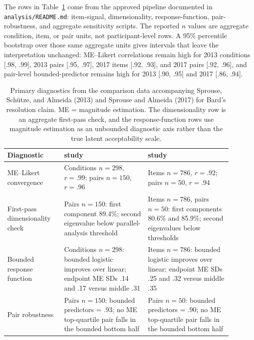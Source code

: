 The rows in Table~\ref{tab:sprouse-diagnostics} come from the approved pipeline
documented in \texttt{analysis/README.md}: item-signal, dimensionality,
response-function, pair-robustness, and aggregate sensitivity scripts. The
reported \(n\) values are aggregate condition, item, or pair units, not
participant-level rows. A 95\% percentile bootstrap over those same aggregate
units gives intervals that leave the interpretation unchanged: ME--Likert
correlations remain high for 2013 conditions [.98, .99], 2013 pairs [.95,
.97], 2017 items [.92, .93], and 2017 pairs [.92, .96], and pair-level
bounded-predictor \Rsq{} remains high for 2013 [.90, .95] and 2017
[.86, .94].

\begin{table}[H]
\centering
\small
\renewcommand{\arraystretch}{1.08}
\begin{tabular}{@{}>{\raggedright\arraybackslash}p{0.23\linewidth}>{\raggedright\arraybackslash}p{0.34\linewidth}>{\raggedright\arraybackslash}p{0.34\linewidth}@{}}
\toprule
Diagnostic & 2013 study & 2017 study \\
\midrule
ME--Likert convergence & Conditions \(n=298\), \(r=.99\); pairs \(n=150\), \(r=.96\) & Items \(n=786\), \(r=.92\); pairs \(n=50\), \(r=.94\) \\ \addlinespace[2pt]
First-pass dimensionality check & Pairs \(n=150\): first component 89.4\%; second eigenvalue below parallel-analysis threshold & Items \(n=786\), pairs \(n=50\): first components 80.6\% and 85.9\%; second eigenvalues below thresholds \\ \addlinespace[2pt]
Bounded response function & Conditions \(n=298\): bounded logistic improves over linear; endpoint ME SDs .14 and .17 versus middle .31 & Items \(n=786\): bounded logistic improves over linear; endpoint ME SDs .25 and .32 versus middle .35 \\ \addlinespace[2pt]
Pair robustness & Pairs \(n=150\): bounded predictors \Rsq{} = .93; no ME top-quartile pair falls in the bounded bottom half & Pairs \(n=50\): bounded predictors \Rsq{} = .90; no ME top-quartile pair falls in the bounded bottom half \\
\bottomrule
\end{tabular}
\caption{Primary diagnostics from the comparison data accompanying Sprouse,
Sch\"utze, and Almeida (2013) and Sprouse and Almeida (2017) for Bard's
resolution claim. ME = magnitude estimation. The dimensionality row is an
aggregate first-pass check,
and the response-function rows use magnitude estimation as an unbounded
diagnostic axis rather than the true latent acceptability scale.}
\label{tab:sprouse-diagnostics}
\end{table}

